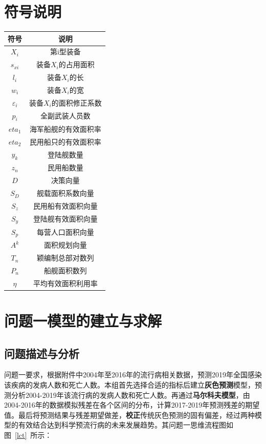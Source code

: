 \documentclass{whutmod}
\begin{document}
	
	\section{符号说明}
	\begin{table}[H]
	\label{biao} \centering

	\begin{tabular}{cc}
		\toprule[1.5pt]
		\multicolumn{1}{m{5cm}}{\centering 符号} & \multicolumn{1}{m{5cm}}{\centering 说明} \\
		\midrule[1pt]		
		$X_{i}$  &  第i型装备 \\ 
		$s_{xi}$  &  装备$X_{i}$的占用面积 \\ 
		$l_{i}$  & 装备$X_{i}$的长\\
		$w_{i}$  &  装备$X_{i}$的宽 \\ 
		$\varepsilon _{i}$ & 装备$X_{i}$的面积修正系数\\
		$p_{i}$	 &  全副武装人员数  \\ 
		$eta_{1}$ &  海军船舰的有效面积率 \\ 
		$eta_{2}$	 &  民用船只的有效面积率 \\ 
		$y_{k}$  &   登陆舰数量\\ 
		$z_{n}$  &  民用船数量\\	
		$D$ & 决策向量\\
		$S_{D}$ &  舰载面积系数向量\\ 
		$S_{z}$ & 民用船有效面积向量\\
		$S_{y}$ & 登陆舰有效面积向量\\
		$S_{p}$ & 每营人口面积向量\\
		$A^{k}$  & 面积规划向量\\
		$T_{n}$ & 颖编制总部对数列\\
		$P_{n}$ & 船舰面积数列\\
		$\eta $ &  平均有效面积利用率\\

		\bottomrule[1.5pt]
	\end{tabular}
\end{table}

	\section{问题一模型的建立与求解}
    \subsection{问题描述与分析}

    问题一要求，根据附件中2004年至2016年的流行病相关数据，预测2019年全国感染该疾病的发病人数和死亡人数。本组首先选择合适的指标后建立\textbf{灰色预测}模型，预测分析2004-2019年该流行病的发病人数和死亡人数。再通过\textbf{马尔科夫模型}，由2004-2016年的数据模拟残差在各个区间的分布，计算2017-2019年预测残差的期望值。最后将预测结果与残差期望做差，\textbf{校正}传统灰色预测的固有偏差，经过两种模型的有效结合达到科学预流行病的未来发展趋势。其问题一思维流程图如图~\ref{lct}~所示：
\end{document}
